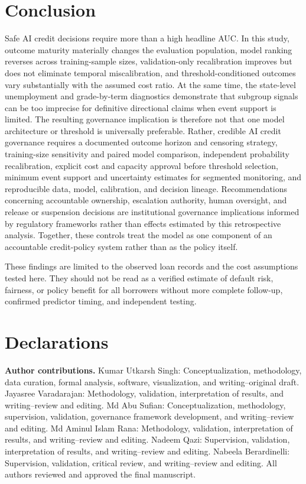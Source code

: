 \documentclass[10pt]{article}
\begin{document}
\section{Conclusion}

Safe AI credit decisions require more than a high headline AUC. In this study, outcome maturity materially changes the evaluation population, model ranking reverses across training-sample sizes, validation-only recalibration improves but does not eliminate temporal miscalibration, and threshold-conditioned outcomes vary substantially with the assumed cost ratio. At the same time, the state-level unemployment and grade-by-term diagnostics demonstrate that subgroup signals can be too imprecise for definitive directional claims when event support is limited. The resulting governance implication is therefore not that one model architecture or threshold is universally preferable. Rather, credible AI credit governance requires a documented outcome horizon and censoring strategy, training-size sensitivity and paired model comparison, independent probability recalibration, explicit cost and capacity approval before threshold selection, minimum event support and uncertainty estimates for segmented monitoring, and reproducible data, model, calibration, and decision lineage. Recommendations concerning accountable ownership, escalation authority, human oversight, and release or suspension decisions are institutional governance implications informed by regulatory frameworks rather than effects estimated by this retrospective analysis. Together, these controls treat the model as one component of an accountable credit-policy system rather than as the policy itself.

These findings are limited to the observed loan records and the cost assumptions tested here. They should not be read as a verified estimate of default risk, fairness, or policy benefit for all borrowers without more complete follow-up, confirmed predictor timing, and independent testing.

 \section*{Declarations}

 \noindent\textbf{Author contributions.}
 Kumar Utkarsh Singh: Conceptualization, methodology, data curation, formal analysis, software, visualization, and writing--original draft.
 Jayasree Varadarajan: Methodology, validation, interpretation of results, and writing--review and editing.
 Md Abu Sufian: Conceptualization, methodology, supervision, validation, governance framework development, and writing--review and editing.
 Md Aminul Islam Rana: Methodology, validation, interpretation of results, and writing--review and editing.
 Nadeem Qazi: Supervision, validation, interpretation of results, and writing--review and editing.
 Nabeela Berardinelli: Supervision, validation, critical review, and writing--review and editing.
 All authors reviewed and approved the final manuscript.
\end{document}
